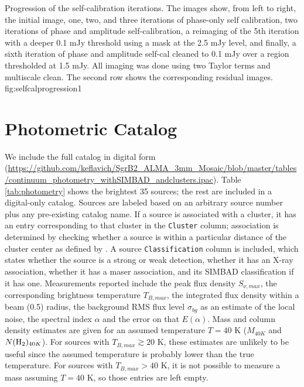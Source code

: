 \documentclass[twocolumn]{aastex61}
\begin{document}
{Progression of the self-calibration iterations.  The images show, from left to
right, the initial image, one, two, and three iterations of phase-only self
calibration, two iterations of phase and amplitude self-calibration,  a
reimaging of the 5th iteration with a deeper 0.1 mJy threshold using a mask at
the 2.5 mJy level, and finally, a sixth iteration of phase and amplitude
self-cal cleaned to 0.1 mJy over a region thresholded at 1.5 mJy.  All imaging
was done using two Taylor terms and multiscale clean.  The second row shows the
corresponding residual images.}
{fig:selfcalprogression}{1}{\textwidth}

\section{Photometric Catalog}
We include the full catalog in digital form
(\url{https://github.com/keflavich/SgrB2_ALMA_3mm_Mosaic/blob/master/tables/continuum_photometry_withSIMBAD_andclusters.ipac}).
Table \ref{tab:photometry} shows
the brightest 35 sources; the rest are included in a digital-only catalog.
Sources are labeled based on an arbitrary source
number plus any pre-existing catalog name.  If a source is associated with a cluster,
it has an entry corresponding to that cluster in the \texttt{Cluster} column;
association is determined by checking whether a source is within a particular distance
of the cluster center as defined by \citet{Schmiedeke2016a}.  A source
\texttt{Classification} column is included, which states whether the source
is a strong or weak detection, whether it has an X-ray association, whether it
has a maser association, and its SIMBAD classification if it has one.
Measurements reported include the peak flux density $S_{\nu,max}$, the
corresponding brightness temperature $T_{B,max}$, the integrated flux density
within a beam (0.5\arcsec) radius, the background RMS flux level $\sigma_{bg}$
as an estimate of the local noise, the spectral index $\alpha$ and the error on
that $E(\alpha)$.  Mass and column density estimates are given for an assumed
temperature $T=40$ K ($M_{40K}$ and $N(\textrm{H}_{2})_{40K}$).  For sources with
$T_{B,max}\gtrsim20$ K, these estimates are unlikely to be useful since the
assumed temperature is probably lower than the true temperature.
For sources with $T_{B,max}>40$ K, it is not possible to measure a mass
assuming $T=40$ K, so those entries are left empty.


\end{document}
